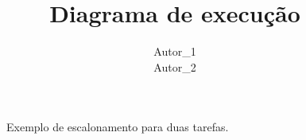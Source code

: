 \documentclass[a4paper,10pt]{article}
\title{Diagrama de execução}
\author{Autor\_1\\
        Autor\_2}
\begin{document}
\maketitle

\begin{figure}[h]
  \centering
 
  \begin{RTGrid}[nosymbols=1,width=10cm]{3}{20}
  
  

    
    
    
  \end{RTGrid}
\caption{Exemplo de escalonamento para duas tarefas.}
\label{fig:ex1}
\end{figure}
\end{document}
